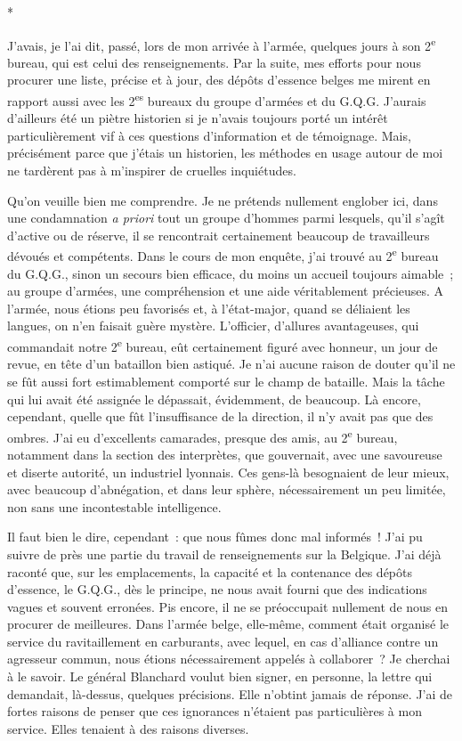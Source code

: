 \documentclass[french,twoside]{book} %
\begin{document}
\begin{center}
\noindent \centerline{*}\par
\end{center}

\noindent J’avais, je l’ai dit, passé, lors de mon arrivée à l’armée, quelques jours à son 2\textsuperscript{e} bureau, qui est celui des renseignements. Par la suite, mes efforts pour nous procurer une liste, précise et à jour, des dépôts d’essence belges me mirent en rapport aussi avec les 2\textsuperscript{es} bureaux du groupe d’armées et du G.Q.G. J’aurais d’ailleurs été un piètre historien si je n’avais toujours porté un intérêt particulièrement vif à ces questions d’information et de témoignage. Mais, précisément parce que j’étais un historien, les méthodes en usage autour de moi ne tardèrent pas à m’inspirer de cruelles inquiétudes.\par
Qu’on veuille bien me comprendre. Je ne prétends nullement englober ici, dans une condamnation {\itshape a priori} tout un groupe d’hommes parmi lesquels, qu’il s’agît d’active ou de réserve, il se rencontrait   certainement beaucoup de travailleurs dévoués et compétents. Dans le cours de mon enquête, j’ai trouvé au 2\textsuperscript{e} bureau du G.Q.G., sinon un secours bien efficace, du moins un accueil toujours aimable ; au groupe d’armées, une compréhension et une aide véritablement précieuses. A l’armée, nous étions peu favorisés et, à l’état-major, quand se déliaient les langues, on n’en faisait guère mystère. L’officier, d’allures avantageuses, qui commandait notre 2\textsuperscript{e} bu­reau, eût certainement figuré avec honneur, un jour de revue, en tête d’un bataillon bien astiqué. Je n’ai aucune raison de douter qu’il ne se fût aussi fort estimablement comporté sur le champ de bataille. Mais la tâche qui lui avait été assignée le dépassait, évidemment, de beaucoup. Là encore, cependant, quelle que fût l’insuffisance de la direction, il n’y avait pas que des ombres. J’ai eu d’excellents cama­rades, presque des amis, au 2\textsuperscript{e} bureau, notamment dans la section des interprètes, que gouvernait, avec une savoureuse et diserte autorité, un industriel lyonnais. Ces gens-là besognaient de leur mieux, avec beaucoup d’abnégation, et dans leur sphère, nécessairement un peu limitée, non sans une incontestable intelligence.\par
Il faut bien le dire, cependant : que nous fûmes donc mal informés ! J’ai pu suivre de près une partie du travail de renseignements sur la Belgique. J’ai déjà raconté que, sur les emplacements, la capacité et la contenance des dépôts d’essence, le G.Q.G., dès le principe, ne nous avait fourni que des indications vagues et souvent erronées. Pis encore, il ne se préoccupait nullement de nous en procurer de meilleures. Dans l’armée belge, elle-même, comment était organisé le service du ravitaillement en carburants, avec lequel, en cas d’alliance contre un agresseur commun, nous étions nécessairement appelés à collaborer ? Je cherchai à le savoir. Le général Blanchard voulut bien signer, en personne, la lettre qui demandait, là-dessus, quelques précisions. Elle   n’obtint jamais de réponse. J’ai de fortes raisons de penser que ces ignorances n’étaient pas particulières à mon service. Elles tenaient à des raisons diverses.\par
\end{document}
